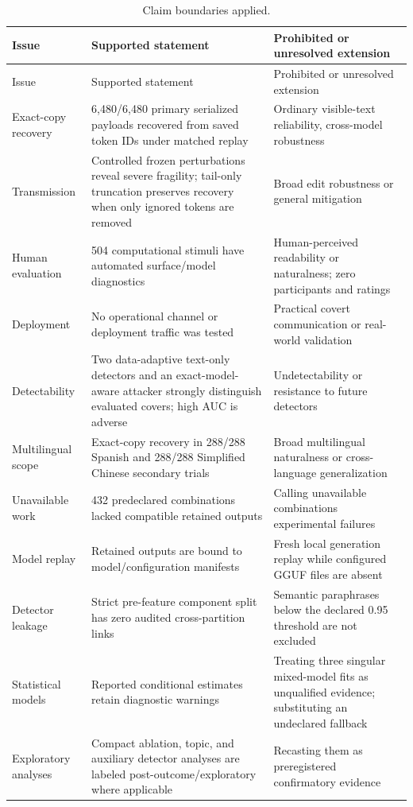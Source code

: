\documentclass[fleqn,10pt]{wlscirep}
\begin{document}
\begin{longtable}{L{0.25\textwidth}L{0.31\textwidth}L{0.35\textwidth}}
\caption{\label{tab:claim-boundaries}Claim boundaries applied.}\\
\toprule
Issue & Supported statement & Prohibited or unresolved extension \\
\midrule
\endfirsthead
\toprule
Issue & Supported statement & Prohibited or unresolved extension \\
\midrule
\endhead
Exact-copy recovery & 6,480/6,480 primary serialized payloads recovered from saved token IDs under matched replay & Ordinary visible-text reliability, cross-model robustness \\
Transmission & Controlled frozen perturbations reveal severe fragility; tail-only truncation preserves recovery when only ignored tokens are removed & Broad edit robustness or general mitigation \\
Human evaluation & 504 computational stimuli have automated surface/model diagnostics & Human-perceived readability or naturalness; zero participants and ratings \\
Deployment & No operational channel or deployment traffic was tested & Practical covert communication or real-world validation \\
Detectability & Two data-adaptive text-only detectors and an exact-model-aware attacker strongly distinguish evaluated covers; high AUC is adverse & Undetectability or resistance to future detectors \\
Multilingual scope & Exact-copy recovery in 288/288 Spanish and 288/288 Simplified Chinese secondary trials & Broad multilingual naturalness or cross-language generalization \\
Unavailable work & 432 predeclared combinations lacked compatible retained outputs & Calling unavailable combinations experimental failures \\
Model replay & Retained outputs are bound to model/configuration manifests & Fresh local generation replay while configured GGUF files are absent \\
Detector leakage & Strict pre-feature component split has zero audited cross-partition links & Semantic paraphrases below the declared 0.95 threshold are not excluded \\
Statistical models & Reported conditional estimates retain diagnostic warnings & Treating three singular mixed-model fits as unqualified evidence; substituting an undeclared fallback \\
Exploratory analyses & Compact ablation, topic, and auxiliary detector analyses are labeled post-outcome/exploratory where applicable & Recasting them as preregistered confirmatory evidence \\

\end{longtable}
\end{document}
